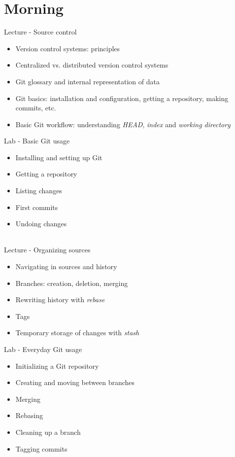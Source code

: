 \documentclass[a4paper,12pt,obeyspaces,spaces,hyphens]{article}
\begin{document}
\feshowtitle

\certificate{}
\disabilities{}

\section{Morning}

\feagendatwocolumn
{Lecture - Source control}
{
  \begin{itemize}
  \item Version control systems: principles
  \item Centralized vs. distributed version control systems
  \item Git glossary and internal representation of data
  \item Git basics: installation and configuration, getting a repository, making commits, etc.
  \item Basic Git workflow: understanding {\em HEAD}, {\em index} and {\em working directory}
  \end{itemize}
}
{Lab - Basic Git usage}
{
  \begin{itemize}
  \item Installing and setting up Git
  \item Getting a repository
  \item Listing changes
  \item First commits
  \item Undoing changes
  \end{itemize}
}
\\
\feagendatwocolumn
{Lecture - Organizing sources}
{
  \begin{itemize}
  \item Navigating in sources and history
  \item Branches: creation, deletion, merging
  \item Rewriting history with {\em rebase}
  \item Tags
  \item Temporary storage of changes with {\em stash}
  \end{itemize}
}
{Lab - Everyday Git usage}
{
  \begin{itemize}
  \item Initializing a Git repository
  \item Creating and moving between branches
  \item Merging
  \item Rebasing
  \item Cleaning up a branch
  \item Tagging commits
  \end{itemize}
}
\end{document}
